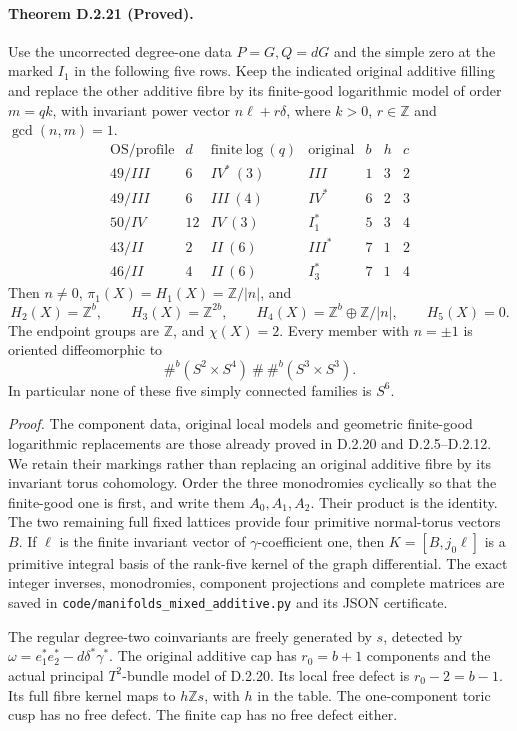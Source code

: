 \paragraph{Theorem D.2.21 (Proved).}
Use the uncorrected degree-one data $P=G,Q=dG$ and the simple zero at the
marked $I_1$ in the following five rows. Keep the indicated original
additive filling and replace the other additive fibre by its finite-good
logarithmic model of order $m=qk$, with invariant power vector
$n\ell+r\delta$, where $k>0$, $r\in\mathbb Z$ and $\gcd(n,m)=1$.
\[
\begin{array}{c|c|c|r|r|r|r}
\mathrm{OS/profile}&d&\mathrm{finite\ log}\ (q)&\mathrm{original}&b&h&c\\\hline
49/III&6&IV^*\ (3)&III&1&3&2\\
49/III&6&III\ (4)&IV^*&6&2&3\\
50/IV&12&IV\ (3)&I_1^*&5&3&4\\
43/II&2&II\ (6)&III^*&7&1&2\\
46/II&4&II\ (6)&I_3^*&7&1&4
\end{array}
\]
Then $n\ne0$, $\pi_1(X)=H_1(X)=\mathbb Z/|n|$, and
\[
 H_2(X)=\mathbb Z^b,\qquad H_3(X)=\mathbb Z^{2b},\qquad
 H_4(X)=\mathbb Z^b\oplus\mathbb Z/|n|,\qquad H_5(X)=0.
\]
The endpoint groups are $\mathbb Z$, and $\chi(X)=2$.
Every member with $n=\pm1$ is oriented diffeomorphic to
\[
                 \#^b(S^2\times S^4)\ \#\ \#^b(S^3\times S^3).
\]
In particular none of these five simply connected families is $S^6$.

\emph{Proof.} The component data, original local models and geometric
finite-good logarithmic replacements are those already proved in
D.2.20 and D.2.5--D.2.12. We retain their markings rather than replacing
an original additive fibre by its invariant torus cohomology. Order the
three monodromies cyclically so that the finite-good one is first, and
write them $A_0,A_1,A_2$. Their product is the identity. The two remaining
full fixed lattices provide four primitive normal-torus vectors $B$.
If $\ell$ is the finite invariant vector of $\gamma$-coefficient one,
then $K=[B,j_0\ell]$ is a primitive integral basis of the rank-five
kernel of the graph differential. The exact integer inverses, monodromies,
component projections and complete matrices are saved in
\texttt{code/manifolds\_mixed\_additive.py} and its JSON certificate.

The regular degree-two coinvariants are freely generated by $s$, detected
by $\omega=e_1^*e_2^*-d\delta^*\gamma^*$. The original additive cap has
$r_0=b+1$ components and the actual principal $T^2$-bundle model of
D.2.20. Its local free defect is $r_0-2=b-1$. Its full fibre kernel maps
to $h\mathbb Zs$, with $h$ in the table. The one-component toric cusp
has no free defect. The finite cap has no free defect either.

